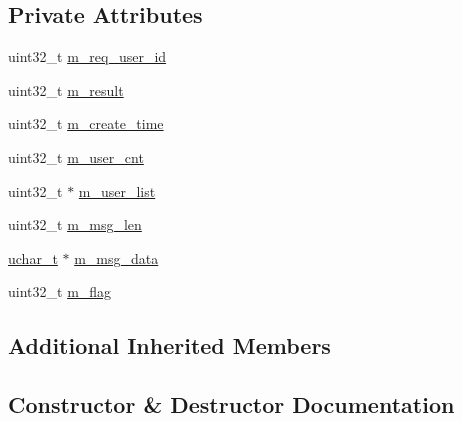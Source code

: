 \subsection*{Private Attributes}
\begin{DoxyCompactItemize}
\item 
uint32\+\_\+t \hyperlink{class_c_im_pdu_group_p2_p_message_response_aa6ab93cbe15051da627988132890ccb4}{m\+\_\+req\+\_\+user\+\_\+id}
\item 
uint32\+\_\+t \hyperlink{class_c_im_pdu_group_p2_p_message_response_aadfd8f3cf1c949f249f99d2611ae4af8}{m\+\_\+result}
\item 
uint32\+\_\+t \hyperlink{class_c_im_pdu_group_p2_p_message_response_a6a4c38a1ca0094f2e69594d1b1ded6ea}{m\+\_\+create\+\_\+time}
\item 
uint32\+\_\+t \hyperlink{class_c_im_pdu_group_p2_p_message_response_a6abe3687a10a416111c90be085c966f1}{m\+\_\+user\+\_\+cnt}
\item 
uint32\+\_\+t $\ast$ \hyperlink{class_c_im_pdu_group_p2_p_message_response_ab917f135d8ffdfa05cf94559e06c1868}{m\+\_\+user\+\_\+list}
\item 
uint32\+\_\+t \hyperlink{class_c_im_pdu_group_p2_p_message_response_ac3b6b42a63bd0d76bd462bc1b4c30ef5}{m\+\_\+msg\+\_\+len}
\item 
\hyperlink{base_2ostype_8h_a124ea0f8f4a23a0a286b5582137f0b8d}{uchar\+\_\+t} $\ast$ \hyperlink{class_c_im_pdu_group_p2_p_message_response_aea2789c3bcab83f72859a1937286ba3e}{m\+\_\+msg\+\_\+data}
\item 
uint32\+\_\+t \hyperlink{class_c_im_pdu_group_p2_p_message_response_a3b9f569e26091806f124c0ba4214a821}{m\+\_\+flag}
\end{DoxyCompactItemize}
\subsection*{Additional Inherited Members}


\subsection{Constructor \& Destructor Documentation}
\hypertarget{class_c_im_pdu_group_p2_p_message_response_a9c13c5bac7fd4fef5fdc699f6afc24d5}{}
